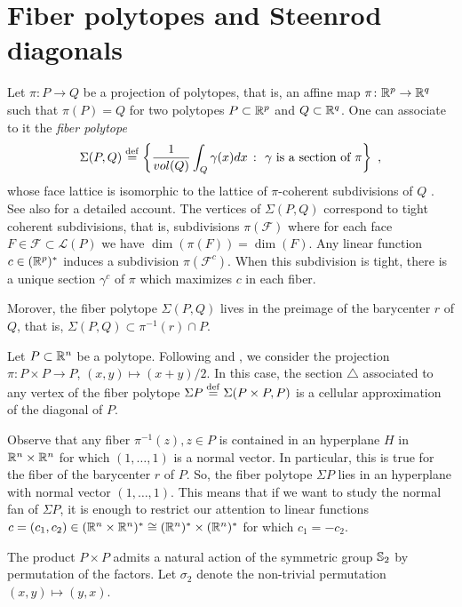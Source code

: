 
\section{Fiber polytopes and Steenrod diagonals} \label{s:fiber polytopes and Steenrod diagonals}

Let $\pi \colon P \to Q$ be a projection of polytopes, that is, an affine map $\pi \colon \R^p \to \R^q$ such that $\pi(P)=Q$ for two polytopes $P\subset \R^p$ and $Q \subset \R^q$.
One can associate to it the \emph{fiber polytope} \[\Sigma(P,Q) \defeq \left\{ \frac{1}{vol(Q)}\int_Q \gamma(x)dx \ \colon \ \gamma \text{ is a section of }\pi \right\} \ , \] whose face lattice is isomorphic to the lattice of $\pi$-coherent subdivisions of $Q$ \cite{BilleraSturmfels92}.
See also \cite[Chapter 9]{Ziegler95} for a detailed account.
The vertices of $\Sigma(P,Q)$ correspond to tight coherent subdivisions, that is, subdivisions $\pi(\mathcal{F})$ where for each face $F \in \mathcal{F}\subset\mathcal{L}(P)$ we have $\dim(\pi(F))=\dim(F)$.
Any linear function $c\in (\R^p)^{*}$ induces a subdivision $\pi(\mathcal{F}^c)$.
When this subdivision is tight, there is a unique section $\gamma^c$ of $\pi$ which maximizes $c$ in each fiber.

Morover, the fiber polytope $\Sigma(P,Q)$ lives in the preimage of the barycenter $r$ of $Q$, that is, $\Sigma(P,Q)\subset\pi^{-1}(r)\cap P$.

Let $P\subset\R^n$ be a polytope.
Following \cite{MTTV19} and \cite{GLA21}, we consider the projection $\pi \colon P\times P \to P$, $(x,y)\mapsto (x+y)/2$.
In this case, the section $\triangle$ associated to any vertex of the fiber polytope $\Sigma P \defeq \Sigma(P\times P,P)$ is a cellular approximation of the diagonal of $P$.

Observe that any fiber $\pi^{-1}(z), z \in P$ is contained in an hyperplane $H$ in $\R^n\times\R^n$ for which $(1,\ldots,1)$ is a normal vector.
In particular, this is true for the fiber of the barycenter $r$ of $P$.
So, the fiber polytope $\Sigma P$ lies in an hyperplane with normal vector $(1,\ldots,1)$.
This means that if we want to study the normal fan of $\Sigma P$, it is enough to restrict our attention to linear functions $c=(c_1,c_2) \in (\R^n \times \R^n)^{*}\cong (\R^n)^{*}\times (\R^n)^{*}$ for which $c_1=-c_2$.

The product $P\times P$ admits a natural action of the symmetric group $\S_2$ by permutation of the factors.
Let $\sigma_2$ denote the non-trivial permutation $(x,y)\mapsto (y,x)$.

